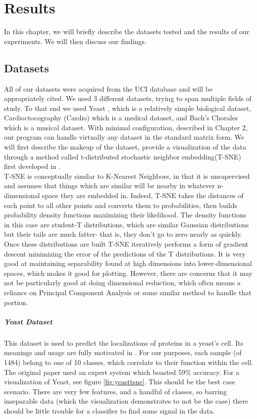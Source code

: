 \chapter{Results}\label{ch:results}
In this chapter, we will briefly describe the datasets tested and the results of our experiments.  We will then discuss our findings.
\section{Datasets}
All of our datasets were acquired from the UCI database \cite{lichman_uci_2013} and will be appropriately cited.  We used 3 different datasets, trying to span multiple fields of study.  To that end we used Yeast \cite{paul_horton_uci_1996}, which is a relatively simple biological dataset, Cardioctocography \cite{j._p._marques_de_sa_uci_2010} (Cardio) which is a medical dataset, and Bach's Chorales \cite{daniele_p._radicioni_uci_2014} which is a musical dataset.  With minimal configuration, described in Chapter 2, our program can handle virtually any dataset in the standard matrix form.  We will first describe the makeup of the dataset, provide a visualization of the data through a method called t-distributed stochastic neighbor embedding(T-SNE) first developed in \cite{maaten_visualizing_2008}.\\
T-SNE is conceptually similar to K-Nearest Neighbors, in that it is unsupervised and assumes that things which are similar will be nearby in whatever n-dimensional space they are embedded in.  Indeed, T-SNE takes the distances of each point to all other points and converts them to probabilities, then builds probability density functions maximizing their likelihood.  The density functions in this case are student-T distributions, which are similar Gaussian distributions but their tails are much fatter- that is, they don't go to zero nearly as quickly.  Once these distributions are built T-SNE iteratively performs a form of gradient descent minimizing the error of the predictions of the T distributions.  It is very good at maintaining separability found at high dimensions into lower-dimensional spaces, which makes it good for plotting. However, there are concerns that it may not be particularly good at doing dimensional reduction, which often means a reliance on Principal Component Analysis or some similar method to handle that portion.\\
\paragraph{Yeast Dataset}
This dataset is used to predict the localizations of proteins in a yeast's cell.  Its meanings and usage are fully motivated in \cite{nakai_knowledge_1992}.  For our purposes, each sample (of 1484) belong to one of 10 classes, which correlate to their function within the cell.  The original paper used an expert system which boasted 59\% accuracy.  For a visualization of Yeast, see figure \ref{fig:yeasttsne}.  This should be the best case scenario.  There are very few features, and a handful of classes, so barring inseparable data (which the visualization demonstrates to not be the case) there should be little trouble for a classifier to find some signal in the data.


